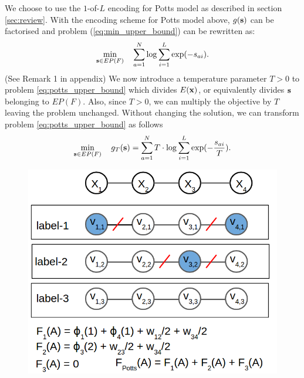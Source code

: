  We choose to use the $1$-of-$L$ encoding for Potts model as described in section \ref{sec:review}. With the encoding scheme for Potts model above, $g({\bf s})$ can be factorised and problem (\ref{eq:min_upper_bound}) can be rewritten as:
%
\begin{equation}
\min_{{\bf s} \in EP(F)} \quad \sum_{a = 1}^{N} \log \sum_{i = 1}^L \exp(-s_{ai}).
\label{eq:potts_upper_bound}
\end{equation}
(See Remark 1 in appendix)
 We now introduce
a temperature parameter $T > 0$ to problem \eqref{eq:potts_upper_bound} which
divides $E({\bf x})$, or equivalently divides $\bf s$ belonging to $EP(F)$. Also, since $T > 0$, we can multiply the objective by $T$ leaving the problem unchanged. Without changing the solution, we can transform problem \eqref{eq:potts_upper_bound} as follows
\begin{equation}
    \min_{{\bf s} \in EP(F)} \quad g_T ({\bf s}) = \sum_{a = 1}^{N} T \cdot \log \sum_{i = 1}^L \exp(-\frac{s_{ai}}{T}).
\label{eq:potts_temp}
\end{equation}

\begin{figure}
\centering
\includegraphics[scale = 0.30]{./figures/potts_chain_extension.png}
\label{fig:alternate}
\end{figure}

